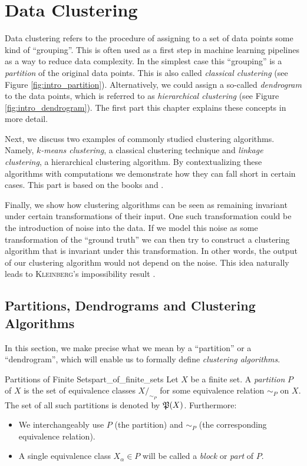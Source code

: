 \chapter{Data Clustering}
\label{chapter__dataclustering}

Data clustering refers to the procedure of assigning to a set of data points some kind of ``grouping''. 
This is often used as a first step in machine learning pipelines as a way to reduce data complexity.
In the simplest case this ``grouping'' is a \emph{partition} of the original data points. This is also called \emph{classical clustering} (see Figure \ref{fig:intro_partition}).
Alternatively, we could assign a so-called \emph{dendrogram}
to the data points, which is referred to as \emph{hierarchical clustering} (see Figure \ref{fig:intro_dendrogram}). The first part this chapter explains these concepts in more detail.

Next, we discuss two examples of commonly studied clustering algorithms. Namely, \emph{$k$-means clustering}, a classical clustering technique and \emph{linkage clustering}, a hierarchical clustering algorithm.
%
By contextualizing these algorithms with computations we demonstrate how they can fall short in certain cases.
This part is based on the books \cite{Everitt2011} and \cite{Scitovski2021}.

Finally, we show how clustering algorithms can be seen as remaining invariant under certain transformations of their input.
%
One such transformation could be the introduction of noise into the data.
If we model this noise as some transformation of the ``ground truth'' we can then try to construct a clustering algorithm that is invariant under this transformation. In other words, the output of our clustering algorithm would not depend on the noise. This idea naturally leads to \textsc{Kleinberg}'s impossibility result \cite{Kleinberg2002}.


\section{Partitions, Dendrograms and Clustering Algorithms}
\label{section__partitions}
In this section, we make precise what we mean by a ``partition'' or a ``dendrogram'', which will enable us to formally define \emph{clustering algorithms}.

\begin{definition}{Partitions of Finite Sets}{part_of_finite_sets}
Let $X$ be a finite set. A \emph{partition} $P$ of $X$ is the set of equivalence classes $X/_{\sim_P}$ for some equivalence relation $\sim_P$ on $X$. The set of all such partitions is denoted by $\P(X)$. Furthermore:
\begin{itemize}
    \item We interchangeably use $P$ (the partition) and $\sim_P$ (the corresponding equivalence relation).
    \item A single equivalence class $X_\alpha \in P$ will be called a \emph{block} or \emph{part} of $P$.
\end{itemize}
\end{definition}

